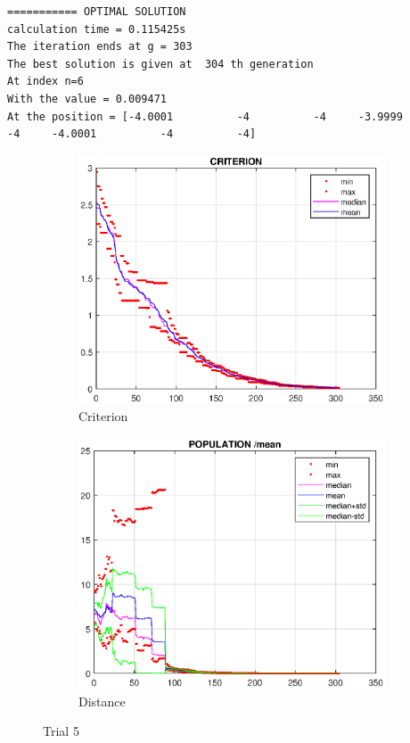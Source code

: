 \documentclass{CSArticle}[english]
\begin{document}
\begin{lstlisting}[style=RESULT,caption={trial 5}]
=========== OPTIMAL SOLUTION
calculation time = 0.115425s 
The iteration ends at g = 303 
The best solution is given at  304 th generation 
At index n=6 
With the value = 0.009471 
At the position = [-4.0001          -4          -4     -3.9999          -4     -4.0001          -4          -4] 
\end{lstlisting}
\begin{figure}[h!]
\centering
\begin{subfigure}[b]{0.45\textwidth}
         \centering
         \includegraphics[scale=0.45]{figure/Q5_c5.eps}
         \caption{Criterion}
         \label{fig:Q5_c5}
     \end{subfigure}
     \hfill
     \begin{subfigure}[b]{0.45\textwidth}
         \centering
         \includegraphics[scale=0.45]{figure/Q5_p5.eps}
         \caption{Distance}
         \label{fig:Q5_p5}
     \end{subfigure}
     \caption{Trial 5}
     \label{fig:trial5}
\end{figure}
\end{document}
